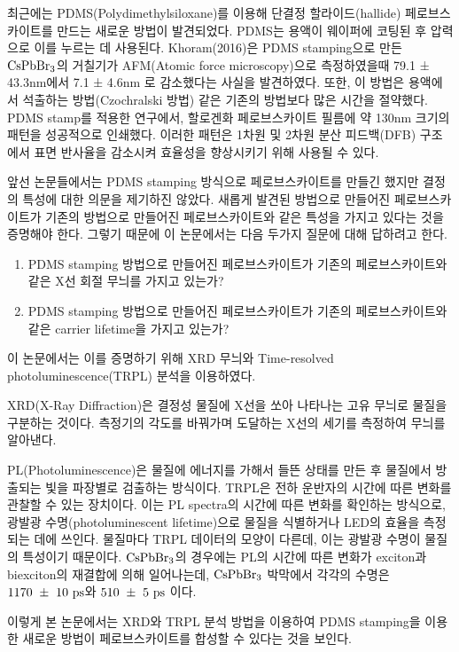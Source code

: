 최근에는 PDMS(Polydimethylsiloxane)를 이용해 단결정 할라이드(hallide) 페로브스카이트를 만드는 새로운 방법이 발견되었다. PDMS는 용액이 웨이퍼에 코팅된 후 압력으로 이를 누르는 데 사용된다. Khoram(2016)은 PDMS stamping으로 만든 $\rm{CsPbBr_3}$의 거칠기가  AFM(Atomic force microscopy)으로 측정하였을때 79.1 ± 43.3nm에서 7.1 ± 4.6nm 로 감소했다는 사실을 발견하였다\cite{khoram2016growth}. 또한, 이 방법은 용액에서 석출하는 방법(Czochralski 방법) 같은 기존의 방법보다 많은 시간을 절약했다. PDMS stamp를 적용한 연구에서, 할로겐화 페로브스카이트 필름에 약 130nm 크기의 패턴을 성공적으로 인쇄했다\cite{brittman2017controlling}. 이러한 패턴은 1차원 및 2차원 분산 피드백(DFB) 구조에서 표면 반사율을 감소시켜 효율성을 향상시키기 위해 사용될 수 있다.

앞선 논문들에서는 PDMS stamping 방식으로 페로브스카이트를 만들긴 했지만 결정의 특성에 대한 의문을 제기하진 않았다. 새롭게 발견된 방법으로 만들어진 페로브스카이트가 기존의 방법으로 만들어진 페로브스카이트와 같은 특성을 가지고 있다는 것을 증명해야 한다. 그렇기 때문에 이 논문에서는 다음 두가지 질문에 대해 답하려고 한다.

\begin{enumerate}
	\item PDMS stamping 방법으로 만들어진 페로브스카이트가 기존의 페로브스카이트와 같은 X선 회절 무늬를 가지고 있는가?
	\item PDMS stamping 방법으로 만들어진 페로브스카이트가 기존의 페로브스카이트와 같은 carrier lifetime을 가지고 있는가?
\end{enumerate}

이 논문에서는 이를 증명하기 위해 XRD 무늬와 Time-resolved photoluminescence(TRPL) 분석을 이용하였다. 

XRD(X-Ray Diffraction)은 결정성 물질에 X선을 쏘아 나타나는 고유 무늬로 물질을 구분하는 것이다. 측정기의 각도를 바꿔가며 도달하는 X선의 세기를 측정하여 무늬를 알아낸다. 

PL(Photoluminescence)은 물질에 에너지를 가해서 들뜬 상태를 만든 후 물질에서 방출되는 빛을 파장별로 검출하는 방식이다. TRPL은 전하 운반자의 시간에 따른 변화를 관찰할 수 있는 장치이다. 이는 PL spectra의 시간에 따른 변화를 확인하는 방식으로, 광발광 수명(photoluminescent lifetime)으로 물질을 식별하거나 LED의 효율을 측정되는 데에 쓰인다. 물질마다 TRPL 데이터의 모양이 다른데, 이는 광발광 수명이 물질의 특성이기 때문이다. $\rm{CsPbBr_3}$의 경우에는 PL의 시간에 따른 변화가 exciton과 biexciton의 재결합에 의해 일어나는데, $\rm{CsPbBr_3}$ 박막에서 각각의 수명은 $\rm{1170~\pm~10~ps}$와 $\rm{510~\pm~5~ps}$ 이다\cite{chen2018room}.

이렇게 본 논문에서는 XRD와 TRPL 분석 방법을 이용하여 PDMS stamping을 이용한 새로운 방법이 페로브스카이트를 합성할 수 있다는 것을 보인다.

